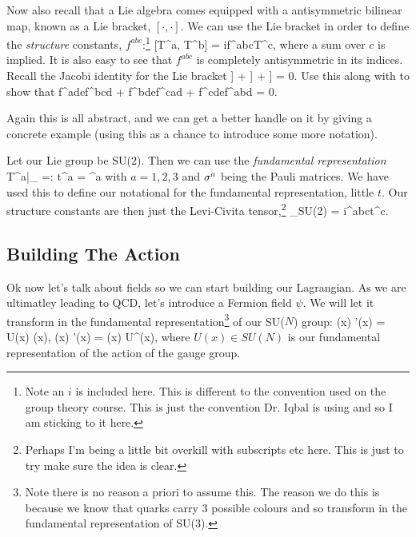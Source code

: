Now also recall that a Lie algebra comes equipped with a antisymmetric bilinear map, known as a Lie bracket, $[\cdot, \cdot ]$. We can use the Lie bracket in order to define the \textit{structure} constants, $f^{abc}$:\footnote{Note an $i$ is included here. This is different to the convention used on the group theory course. This is just the convention Dr. Iqbal is using and so I am sticking to it here.}
\be 
\label{eqn:StructureConstants}
    [T^a, T^b] = if^{abc}T^c,
\ee 
where a sum over $c$ is implied. It is also easy to see that $f^{abc}$ is completely antisymmetric in its indices.  
\bbox 
    Recall the Jacobi identity for the Lie bracket 
    \bse 
        \big[X,[Y,Z]\big] + \big[Z,[X,Y]\big] + \big[Y,[Z,X]\big] = 0.
    \ese 
    Use this along with  to show that 
    \bse 
        f^{ade}f^{bcd} + f^{bde}f^{cad} + f^{cde}f^{abd} = 0.
    \ese 
\ebox  

Again this is all abstract, and we can get a better handle on it by giving a concrete example (using this as a chance to introduce some more notation). 

\bex 
    Let our Lie group be SU($2$). Then we can use the \textit{fundamental representation}
    \bse 
        T^a|_ =: t^a = \sig^a
    \ese 
    with $a=1,2,3$ and $\sigma^a$ being the Pauli matrices. We have used this to define our notational for the fundamental representation, little $t$. Our structure constants are then just the Levi-Civita tensor,\footnote{Perhaps I'm being a little bit overkill with subscripts etc here. This is just to try make sure the idea is clear.} 
    \bse 
        [t^a,t^b]_{SU(2)} = i\epsilon^{abc}t^c.
    \ese 
\eex 

\subsection{Building The Action}

Ok now let's talk about fields so we can start building our Lagrangian. As we are ultimatley leading to QCD, let's introduce a Fermion field $\psi$. We will let it transform in the fundamental representation\footnote{Note there is no reason a priori to assume this. The reason we do this is because we know that quarks carry 3 possible colours and so transform in the fundamental representation of SU(3).} of our SU($N$) group:
\bse 
    \psi(x) \mapsto \psi'(x) = U(x) \psi(x), \qand \overline{\psi}(x) \mapsto \overline{\psi}'(x) = \psi(x) U^{\dagger}(x),
\ese
where $U(x)\in SU(N)$ is our fundamental representation of the action of the gauge group. 

